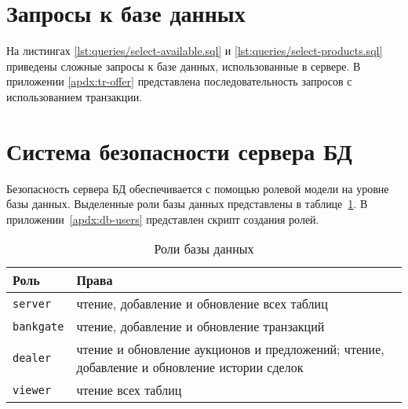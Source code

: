 \section{Запросы к базе данных}

На листингах \ref{lst:queries/select-available.sql} и \ref{lst:queries/select-products.sql} приведены сложные запросы к базе данных, использованные в сервере. В приложении \ref{apdx:tr-offer} представлена последовательность запросов с использованием транзакции.

\newpage


\newpage


\newpage


\section{Система безопасности сервера БД}

Безопасность сервера БД обеспечивается с помощью ролевой модели на уровне базы данных. Выделенные роли базы данных представлены в таблице~\ref{tab:db-roles}. В приложении~\ref{apdx:db-users} представлен скрипт создания ролей.

\begin{table}[!th]
    \centering
    \caption{Роли базы данных}
    \label{tab:db-roles}
    \begin{tabular}{|p{3cm}|p{12cm}|}
         \hline
         \textbf{Роль} & \textbf{Права} \\
         \hline
         \texttt{server} & чтение, добавление и обновление всех таблиц \\
         \hline
         \texttt{bankgate} & чтение, добавление и обновление транзакций \\
         \hline
         \texttt{dealer} & чтение и обновление аукционов и предложений; чтение, добавление и обновление истории сделок \\
         \hline
         \texttt{viewer} & чтение всех таблиц \\
         \hline
    \end{tabular}
\end{table}


